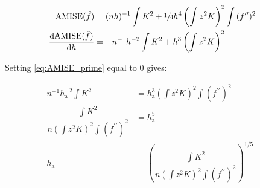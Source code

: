 \begin{align}
\mbox{AMISE}(\hat{f}) & = (nh)^{-1} \int{K^2} + \sfrac{1}{4}h^4\left(\int{z^2K}\right)^2 \int{ (f^{\prime\prime})^2 } && \nonumber \\
\dfrac{\mathrm{d}\mbox{AMISE}(\hat{f})}{\mathrm{d}h} & = -n^{-1}h^{-2} \int{K^2} + h^3 \left(\int{z^2K}\right)^2 && \label{eq:AMISE_prime}
\end{align}

Setting \autoref{eq:AMISE_prime} equal to 0 gives:

\begin{align}
n^{-1}h_{\mbox{a}}^{-2} \int{K^2} & = h_{\mbox{a}}^3 \left(\int{z^2K}\right)^2 \int{ (f^{\prime\prime})^2 } && \nonumber \\
\dfrac{\int{K^2}}{n \left(\int{z^2K}\right)^2 \int{ (f^{\prime\prime})^2 }} & = h_{\mbox{a}}^5 && \nonumber \\
h_{\mbox{a}} & = \left( \dfrac{\int{K^2}}{n \left(\int{z^2K}\right)^2 \int{ (f^{\prime\prime})^2 }} \right)^{1/5} && \label{eq:H_AMISE}
\end{align}

